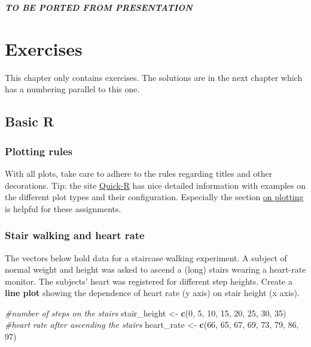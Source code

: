 \documentclass[]{book}
\newenvironment{Shaded}{\begin{snugshade}}{\end{snugshade}}
\newcommand{\CommentTok}[1]{\textcolor[rgb]{0.56,0.35,0.01}{\textit{#1}}}
\newcommand{\DecValTok}[1]{\textcolor[rgb]{0.00,0.00,0.81}{#1}}
\newcommand{\KeywordTok}[1]{\textcolor[rgb]{0.13,0.29,0.53}{\textbf{#1}}}
\newcommand{\NormalTok}[1]{#1}
\newcommand{\StringTok}[1]{\textcolor[rgb]{0.31,0.60,0.02}{#1}}
\begin{document}
\textbf{\emph{TO BE PORTED FROM PRESENTATION}}

\hypertarget{exercises}{%
\chapter{Exercises}\label{exercises}}

This chapter only contains exercises. The solutions are in the next chapter which has a numbering parallel to this one.

\hypertarget{basic-r-1}{%
\section{Basic R}\label{basic-r-1}}

\hypertarget{plotting-rules}{%
\subsection*{Plotting rules}\label{plotting-rules}}

With all plots, take care to adhere to the rules regarding titles and other decorations. Tip: the site \href{http://www.statmethods.net/}{Quick-R} has nice detailed information with examples on the different plot types and their configuration. Especially the section \href{http://www.statmethods.net/graphs/index.html}{on plotting} is helpful for these assignments.

\hypertarget{stair-walking-and-heart-rate}{%
\subsection{Stair walking and heart rate}\label{stair-walking-and-heart-rate}}

The vectors below hold data for a staircase walking experiment. A subject of normal weight and height was asked to ascend a (long) stairs wearing a heart-rate monitor. The subjects' heart was registered for different step heights. Create a \textbf{line plot} showing the dependence of heart rate (y axis) on stair height (x axis).

\begin{Shaded}
\begin{Highlighting}[]
\CommentTok{#number of steps on the stairs}
\NormalTok{stair_height <-}\StringTok{ }\KeywordTok{c}\NormalTok{(}\DecValTok{0}\NormalTok{, }\DecValTok{5}\NormalTok{, }\DecValTok{10}\NormalTok{, }\DecValTok{15}\NormalTok{, }\DecValTok{20}\NormalTok{, }\DecValTok{25}\NormalTok{, }\DecValTok{30}\NormalTok{, }\DecValTok{35}\NormalTok{)}
\CommentTok{#heart rate after ascending the stairs}
\NormalTok{heart_rate <-}\StringTok{ }\KeywordTok{c}\NormalTok{(}\DecValTok{66}\NormalTok{, }\DecValTok{65}\NormalTok{, }\DecValTok{67}\NormalTok{, }\DecValTok{69}\NormalTok{, }\DecValTok{73}\NormalTok{, }\DecValTok{79}\NormalTok{, }\DecValTok{86}\NormalTok{, }\DecValTok{97}\NormalTok{)}
\end{Highlighting}
\end{Shaded}
\end{document}
